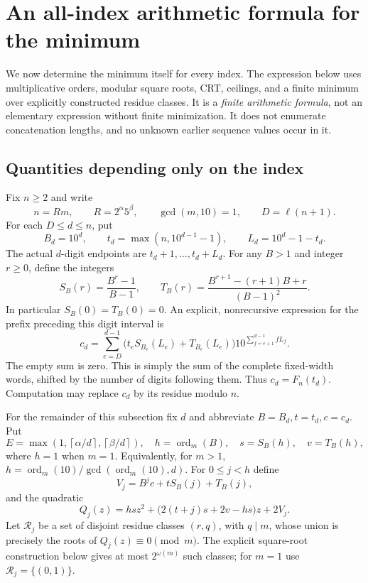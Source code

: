 \section{An all-index arithmetic formula for the minimum}\label{sec:minimum-formula}
We now determine the minimum itself for every index. The expression below
uses multiplicative orders, modular square roots, CRT, ceilings, and a
finite minimum over explicitly constructed residue classes. It is a
\emph{finite arithmetic formula}, not an elementary expression without
finite minimization. It does not enumerate concatenation lengths, and no
unknown earlier sequence values occur in it.

\subsection{Quantities depending only on the index}
Fix $n\ge2$ and write
\[
 n=Rm,\qquad R=2^\alpha5^\beta,\qquad \gcd(m,10)=1,
 \qquad D=\ell(n+1).
\]
For each $D\le d\le n$, put
\[
 B_d=10^d,\qquad t_d=\max(n,10^{d-1}-1),\qquad
 L_d=10^d-1-t_d.
\]
The actual $d$-digit endpoints are $t_d+1,\ldots,t_d+L_d$.
For any $B>1$ and integer $r\ge0$, define the integers
\begin{equation}\label{eq:ST-closed}
 S_B(r)=\frac{B^r-1}{B-1},\qquad
 T_B(r)=\frac{B^{r+1}-(r+1)B+r}{(B-1)^2}.
\end{equation}
In particular $S_B(0)=T_B(0)=0$. An explicit, nonrecursive expression
for the prefix preceding this digit interval is
\begin{equation}\label{eq:boundary-sum}
 c_d=\sum_{e=D}^{d-1}
 \bigl(t_e S_{B_e}(L_e)+T_{B_e}(L_e)\bigr)
 10^{\sum_{f=e+1}^{d-1} fL_f}.
\end{equation}
The empty sum is zero. This is simply the sum of the complete
fixed-width words, shifted by the number of digits following them.
Thus $c_d=F_n(t_d)$. Computation may replace $c_d$ by its residue modulo $n$.

For the remainder of this subsection fix $d$ and abbreviate
$B=B_d,t=t_d,c=c_d$. Put
\[
 E=\max\left(1,\left\lceil\alpha/d\right\rceil,
                  \left\lceil\beta/d\right\rceil\right),\quad
 h=\operatorname{ord}_m(B),\quad s=S_B(h),\quad v=T_B(h),
\]
where $h=1$ when $m=1$. Equivalently, for $m>1$,
$h=\operatorname{ord}_m(10)/\gcd(\operatorname{ord}_m(10),d)$.
For $0\le j<h$ define
\[
 V_j=B^jc+tS_B(j)+T_B(j),
\]
and the quadratic
\begin{equation}\label{eq:phase-quadratic}
 Q_j(z)=hsz^2+\bigl(2(t+j)s+2v-hs\bigr)z+2V_j.
\end{equation}
Let $\mathcal R_j$ be a set of disjoint residue classes $(r,q)$,
with $q\mid m$, whose union is precisely the roots of
$Q_j(z)\equiv0\pmod m$. The explicit square-root construction below
gives at most $2^{\omega(m)}$ such classes; for $m=1$ use
$\mathcal R_j=\{(0,1)\}$.


